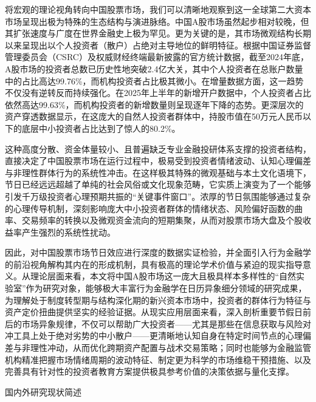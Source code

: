 \documentclass{cupb-thesis}
\begin{document}
将宏观的理论视角转向中国股票市场，我们可以清晰地观察到这一全球第二大资本市场呈现出极为特殊的生态结构与演进脉络。中国A股市场虽然起步相对较晚，但其扩张速度与广度在世界金融史上极为罕见。更为关键的是，其市场微观结构长期以来呈现出以个人投资者（散户）占绝对主导地位的鲜明特征。根据中国证券监督管理委员会（CSRC）及权威财经终端最新披露的官方统计数据，截至2024年底，A股市场的投资者总数已历史性地突破2.4亿大关，其中个人投资者在总账户数量中的占比高达99.76\%，而机构投资者占比极其微小。在增量数据方面，这一趋势不仅没有逆转反而持续强化。在2025年上半年的新增开户数据中，个人投资者占比依然高达99.63\%，而机构投资者的新增数量则呈现逐年下降的态势。更深层次的资产穿透数据显示，在这庞大的自然人投资者群体中，持股市值在50万元人民币以下的底层中小投资者占比达到了惊人的80.2\%。


这种高度分散、资金体量较小、且普遍缺乏专业金融投研体系支撑的投资者结构，直接决定了中国股票市场在运行过程中，极易受到投资者情绪波动、认知心理偏差与非理性群体行为的系统性冲击。在这样极其特殊的微观基础与本土文化语境下，节日已经远远超越了单纯的社会风俗或文化现象范畴，它实质上演变为了一个能够引发千万级投资者心理预期共振的“关键事件窗口”。浓厚的节日氛围能够通过复杂的心理传导机制，深刻影响庞大中小投资者群体的情绪状态、风险偏好函数的曲率、交易频率的转换以及微观资金流向的短期集聚，从而对股票市场大盘及个股收益率产生强烈的系统性扰动。


因此，对中国股票市场节日效应进行深度的数据实证检验，并全面引入行为金融学的前沿视角解构其内在的形成机制，具有极高的理论学术价值与紧迫的现实指导意义。从理论层面来看，本文将中国A股市场这一庞大且极具样本多样性的“自然实验室”作为研究对象，能够极大丰富行为金融学在日历异象细分领域的研究成果，为理解处于制度转型期与结构深化期的新兴资本市场中，投资者的群体行为特征与资产定价扭曲提供坚实的经验证据。从现实应用层面来看，深入剖析重要节假日前后的市场异象规律，不仅可以帮助广大投资者——尤其是那些在信息获取与风险对冲工具上处于绝对劣势的中小散户——更清晰地认知自身在特定时间节点的心理偏差与非理性冲动，从而优化跨期资产配置与战术交易策略；同时也能够为金融监管机构精准把握市场情绪周期的波动特征、制定更为科学的市场维稳干预措施、以及完善具有针对性的投资者教育方案提供极具参考价值的决策依据与量化支撑。


国内外研究现状简述
\end{document}
